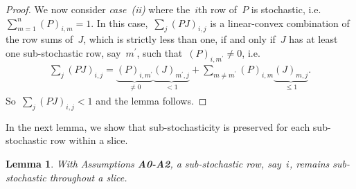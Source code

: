 \documentclass[draftclsnofoot, onecolumn, 12pt]{IEEEtran}
\newtheorem{lem}{Lemma}
\begin{document}
\begin{proof}
We now consider \textit{case~(ii)} where the~$i$th row of~$P$ is stochastic, i.e.~$\sum_{m=1}^{n}{(P)}_{i,m} = 1$. In this case,~$\sum_{j}(PJ)_{i,j}$ is a linear-convex combination of the row sums of~$J$, which is strictly less than one, if and only if~$J$ has at least one sub-stochastic row, say~${m}^{\prime}$, such that~${(P)}_{i,{m}^{\prime}} \neq 0$, i.e.
\begin{eqnarray}\label{20}
\sum_{j}(PJ)_{i,j}=\underbrace{(P)_{i,{m}^{\prime}}}_{\neq 0}\underbrace{(J)_{{m}^{\prime},j}}_{<1}+\sum_{m\neq{m}^{\prime}}(P)_{i,m}\underbrace{(J)_{m,j}}_{\leq1}.
\end{eqnarray}
So~$\sum_{j}(PJ)_{i,j} <1$ and the lemma follows.
\end{proof}

In the next lemma, we show that sub-stochasticity is preserved for each sub-stochastic row within a slice.
\begin{lem}\label{lem3}
With Assumptions {\bf{A0-A2}}, a sub-stochastic row, say~$i$, remains sub-stochastic throughout a slice.
\end{lem} 
\end{document}
